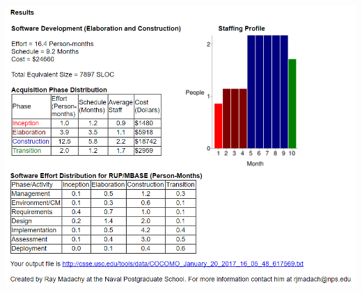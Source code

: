   \begin{center}
  	\includegraphics[width=\textwidth]{Resources/Cocomo_1.PNG}
  	\label{COCOMO result}
  \end{center}
